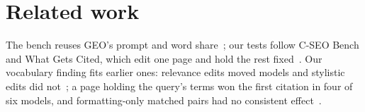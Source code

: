 
\section{Related work}\label{sec:related}

The bench reuses GEO's prompt and word share~\cite{aggarwal2024geo}; our tests follow C-SEO Bench and What Gets Cited, which edit one page and hold the rest fixed~\cite{puerto2025cseo,vishwakarma2026cited}.
Our vocabulary finding fits earlier ones: relevance edits moved models and stylistic edits did not~\cite{wan2024conflictingqa}; a page holding the query's terms won the first citation in four of six models, and formatting-only matched pairs had no consistent effect~\cite{vishwakarma2026cited}.
